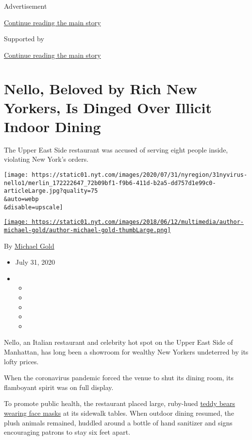 Advertisement

\protect\hyperlink{after-top}{Continue reading the main story}

Supported by

\protect\hyperlink{after-sponsor}{Continue reading the main story}

\hypertarget{nello-beloved-by-rich-new-yorkers-is-dinged-over-illicit-indoor-dining}{%
\section{Nello, Beloved by Rich New Yorkers, Is Dinged Over Illicit
Indoor
Dining}\label{nello-beloved-by-rich-new-yorkers-is-dinged-over-illicit-indoor-dining}}

The Upper East Side restaurant was accused of serving eight people
inside, violating New York's orders.

\texttt{[image: https://static01.nyt.com/images/2020/07/31/nyregion/31nyvirus-nello1/merlin\_172222647\_72b09bf1-f9b6-411d-b2a5-dd757d1e99c0-articleLarge.jpg?quality=75\\\&auto=webp\\\&disable=upscale]}

\href{https://www.nytimes.com/by/michael-gold}{\texttt{[image: https://static01.nyt.com/images/2018/06/12/multimedia/author-michael-gold/author-michael-gold-thumbLarge.png]}}

By \href{https://www.nytimes.com/by/michael-gold}{Michael Gold}

\begin{itemize}
\item
  July 31, 2020
\item
  \begin{itemize}
  \item
  \item
  \item
  \item
  \item
  \end{itemize}
\end{itemize}

Nello, an Italian restaurant and celebrity hot spot on the Upper East
Side of Manhattan, has long been a showroom for wealthy New Yorkers
undeterred by its lofty prices.

When the coronavirus pandemic forced the venue to shut its dining room,
its flamboyant spirit was on full display.

To promote public health, the restaurant placed large, ruby-hued
\href{https://www.instagram.com/p/CAWO_ptHZkY/?igshid=1hs6i7mj6zg5i}{teddy
bears wearing face masks} at its sidewalk tables. When outdoor dining
resumed, the plush animals remained, huddled around a bottle of hand
sanitizer and signs encouraging patrons to stay six feet apart.

